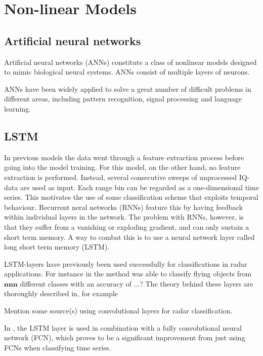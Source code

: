\section{Non-linear Models}

\subsection*{Artificial neural networks}

Artificial neural networks (ANNs) constitute a class of nonlinear models designed to mimic biological neural systems. ANNs consist of multiple layers of neurons. 


ANNs have been widely applied to solve a great number of difficult problems in different areas, including pattern recognition, signal processing and language learning. 


\subsection*{LSTM}
In previous models the data went through a feature extraction process before going into the model training. For this model, on the other hand, no feature extraction is performed. Instead, several consecutive sweeps of unprocessed IQ-data are used as input. Each range bin can be regarded as a one-dimensional time series. This motivates the use of some classification scheme that exploits temporal behaviour. Recurrent neral networks (RNNs) feature this by having feedback within individual layers in the network. \citep{karim_majumdar_darabi_chen_2018} The problem with RNNs, however, is that they suffer from a vanishing or exploding gradient, and can only sustain a short term memory. A way to combat this is to use a neural network layer called long short term memory (LSTM).

LSTM-layers have previously been used successfully for classifications in radar applications. For instance in \citep{jithesh_sagayaraj_srinivasa_2018} the method was able to classify flying objects from $\textbf{nnn}$ different classes with an accuracy of ...? The theory behind these layers are thoroughly described in, for example \citep{hochreiter_schmidhuber_1997}

Mention some source(s) using convolutional layers for radar classification.

 In \citep{karim_majumdar_darabi_chen_2018}, the LSTM layer is used in combination with a fully convolutional neural network (FCN), which proves to be a significant improvement from just using FCNs when classifying time series.

